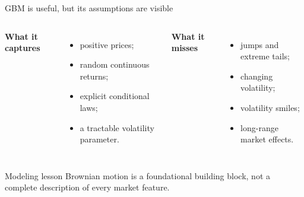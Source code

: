 \documentclass[handout,10pt,aspectratio=169]{beamer}
\begin{document}
\begin{frame}{GBM is useful, but its assumptions are visible}
\begin{columns}[T,onlytextwidth]
\textbf{What it captures}
\begin{itemize}
  \item positive prices;
  \item random continuous returns;
  \item explicit conditional laws;
  \item a tractable volatility parameter.
\end{itemize}
\textbf{What it misses}
\begin{itemize}
  \item jumps and extreme tails;
  \item changing volatility;
  \item volatility smiles;
  \item long-range market effects.
\end{itemize}
\end{columns}
\begin{block}{Modeling lesson}
Brownian motion is a foundational building block, not a complete description of every market feature.
\end{block}
\end{frame}
\end{document}
